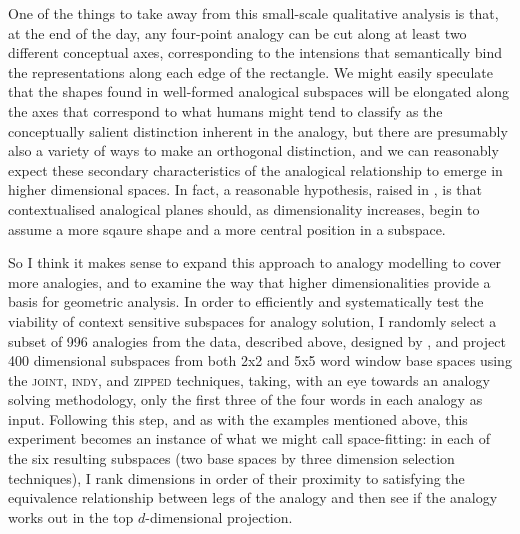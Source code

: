 One of the things to take away from this small-scale qualitative analysis is that, at the end of the day, any four-point analogy can be cut along at least two different conceptual axes, corresponding to the intensions that semantically bind the representations along each edge of the rectangle.  We might easily speculate that the shapes found in well-formed analogical subspaces will be elongated along the axes that correspond to what humans might tend to classify as the conceptually salient distinction inherent in the analogy, but there are presumably also a variety of ways to make an orthogonal distinction, and we can reasonably expect these secondary characteristics of the analogical relationship to emerge in higher dimensional spaces.  In fact, a reasonable hypothesis, raised in \cite{McGregorEA2016}, is that contextualised analogical planes should, as dimensionality increases, begin to assume a more sqaure shape and a more central position in a subspace.

So I think it makes sense to expand this approach to analogy modelling to cover more analogies, and to examine the way that higher dimensionalities provide a basis for geometric analysis.  In order to efficiently and systematically test the viability of context sensitive subspaces for analogy solution, I randomly select a subset of 996 analogies from the data, described above, designed by \cite{MikolovEA2013b}, and project 400 dimensional subspaces from both 2x2 and 5x5 word window base spaces using the \textsc{joint}, \textsc{indy}, and \textsc{zipped} techniques, taking, with an eye towards an analogy solving methodology, only the first three of the four words in each analogy as input.  Following this step, and as with the examples mentioned above, this experiment becomes an instance of what we might call space-fitting: in each of the six resulting subspaces (two base spaces by three dimension selection techniques), I rank dimensions in order of their proximity to satisfying the equivalence relationship between legs of the analogy and then see if the analogy works out in the top $d$-dimensional projection.

